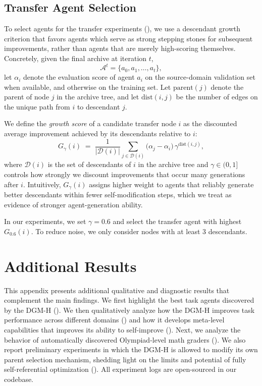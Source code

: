 \documentclass[]{fairmeta}
\begin{document}
\subsection{Transfer Agent Selection}
\label{app:transfer-selection}

To select agents for the transfer experiments (), we use a descendant growth criterion that favors agents which serve as strong stepping stones for subsequent improvements, rather than agents that are merely high-scoring themselves.
Concretely, given the final archive at iteration \(t\),
\[
\mathcal{A}^t = \{a_0, a_1, \dots, a_t\},
\]
let \(\alpha_i\) denote the evaluation score of agent \(a_i\) on the source-domain validation set when available, and otherwise on the training set.
Let \(\mathrm{parent}(j)\) denote the parent of node \(j\) in the archive tree, and let \(\mathrm{dist}(i,j)\) be the number of edges on the unique path from \(i\) to descendant \(j\).

We define the \emph{growth score} of a candidate transfer node \(i\) as the discounted average improvement achieved by its descendants relative to \(i\):
\[
G_\gamma(i)
\;=\;
\frac{1}{|\mathcal{D}(i)|}
\sum_{j \in \mathcal{D}(i)}
\bigl(\alpha_j - \alpha_i\bigr)\,\gamma^{\mathrm{dist}(i,j)},
\]
where \(\mathcal{D}(i)\) is the set of descendants of \(i\) in the archive tree and \(\gamma \in (0,1]\) controls how strongly we discount improvements that occur many generations after \(i\).
Intuitively, \(G_\gamma(i)\) assigns higher weight to agents that reliably generate better descendants within fewer self-modification steps, which we treat as evidence of stronger agent-generation ability.

In our experiments, we set \(\gamma = 0.6\) and select the transfer agent with highest \(G_{0.6}(i)\). To reduce noise, we only consider nodes with at least 3 descendants.

\section{Additional Results}
\label{app:res}

This appendix presents additional qualitative and diagnostic results that complement the main findings. We first highlight the best task agents discovered by the DGM-H (). We then qualitatively analyze how the DGM-H improves task performance across different domains () and how it develops meta-level capabilities that improves its ability to self-improve (). Next, we analyze the behavior of automatically discovered Olympiad-level math graders (). We also report preliminary experiments in which the DGM-H is allowed to modify its own parent selection mechanism, shedding light on the limits and potential of fully self-referential optimization (). All experiment logs are open-sourced in our codebase.
\end{document}
